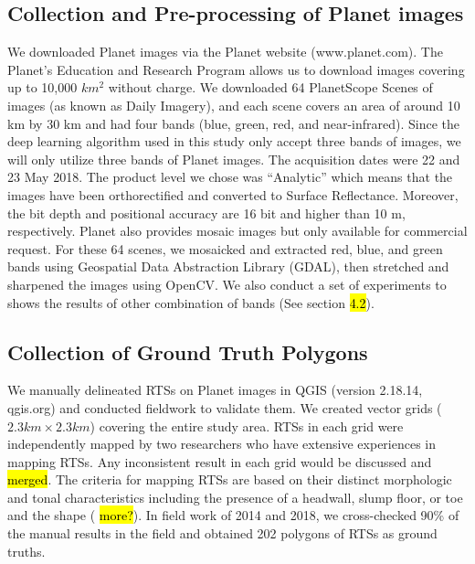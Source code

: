 \documentclass[preprint,12pt,authoryear]{elsarticle}
\begin{document}
\subsection{Collection and Pre-processing of Planet images}
\label{subsec_collect_images}

We downloaded Planet images via the Planet website (www.planet.com). The Planet’s Education and Research Program allows us to download images covering up to 10,000 $km^2$ without charge. We downloaded 64 PlanetScope Scenes of images (as known as Daily Imagery), and each scene covers an area of around 10 km by 30 km and had four bands (blue, green, red, and near-infrared). Since the deep learning algorithm used in this study only accept three bands of images, we will only utilize three bands of Planet images. The acquisition dates were 22 and 23 May 2018. The product level we chose was “Analytic” which means that the images have been orthorectified and converted to Surface Reflectance. Moreover, the bit depth and positional accuracy are 16 bit and higher than 10 m, respectively. Planet also provides mosaic images but only available for commercial request. For these 64 scenes, we mosaicked and extracted red, blue, and green bands using Geospatial Data Abstraction Library (GDAL), then stretched and sharpened the images using OpenCV. We also conduct a set of experiments to shows the results of other combination of bands (See section \hl{4.2}).

\subsection{Collection of Ground Truth Polygons}
\label{subsec_collect_groundtruth}

We manually delineated RTSs on Planet images in QGIS (version 2.18.14, qgis.org) and conducted fieldwork to validate them. We created vector grids ($2.3 km\times2 .3km$) covering the entire study area. RTSs in each grid were independently mapped by two researchers who have extensive experiences in mapping RTSs. Any inconsistent result in each grid would be discussed and \hl{merged}. The criteria for mapping RTSs are based on their distinct morphologic and tonal characteristics including the presence of a headwall, slump floor, or toe and the shape (\hl{ more?}). In field work of 2014 and 2018, we cross-checked 90\% of the manual results in the field and obtained 202 polygons of RTSs as ground truths.  %
\end{document}
